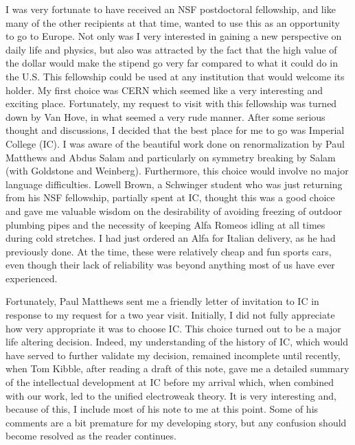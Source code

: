 \documentclass[12pt]{article}
\begin{document}
    I was very fortunate to have received an NSF postdoctoral
    fellowship, and like many of the other recipients at that time,
    wanted to use this as an opportunity to go to Europe. Not only was
    I very interested in gaining a new perspective on daily life and
    physics, but also was attracted by the fact that the high value of
    the dollar would make the stipend go very far compared to what it
    could do in the U.S. This fellowship could be used at any
    institution that would welcome its holder. My first choice was
    CERN which seemed like a very interesting and exciting
    place. Fortunately, my request to visit with this fellowship was
    turned down by Van Hove, in what seemed a very rude manner. After
    some serious thought and discussions, I decided that the best
    place for me to go was Imperial College (IC). I was aware of the
    beautiful work done on renormalization by Paul Matthews and Abdus
    Salam and particularly on symmetry breaking by
    Salam (with Goldstone and Weinberg)\cite{gsw;1962}. Furthermore,
    this choice would involve no major language difficulties. Lowell
    Brown, a Schwinger student who was just returning from his NSF
    fellowship, partially spent at IC, thought this was a good choice
    and gave me valuable wisdom on the desirability of avoiding
    freezing of outdoor plumbing pipes and the necessity of keeping
    Alfa Romeos idling at all times during cold stretches. I had just
    ordered an Alfa for Italian delivery, as he had previously done. At
    the time, these were relatively cheap and fun sports cars, even
    though their lack of reliability was beyond anything most of us
    have ever experienced.

    Fortunately, Paul Matthews sent me a friendly letter of invitation
    to IC in response to my request for a two year visit. Initially, I
    did not fully appreciate how very appropriate it was to choose
    IC. This choice turned out to be a major life altering
    decision. Indeed, my understanding of the history of IC, which
    would have served to further validate my decision, remained
    incomplete until recently, when Tom Kibble, after reading a draft
    of this note, gave me a detailed summary of the intellectual
    development at IC before my arrival which, when combined with our
    work, led to the unified electroweak theory. It is very
    interesting and, because of this, I include most of his note to me
    at this point. Some of his comments are a bit premature for my
    developing story, but any confusion should become resolved as the
    reader continues.
\end{document}
